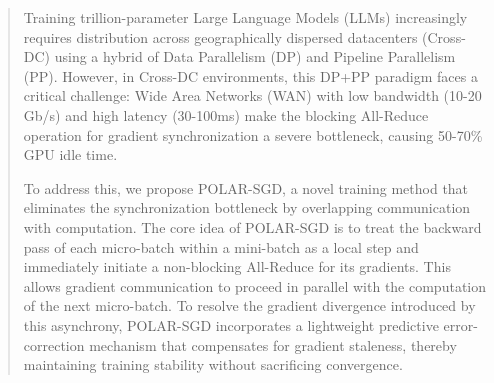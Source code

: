 \documentclass{article}
\theoremstyle{plain}
\theoremstyle{definition}
\theoremstyle{remark}
\begin{document}
\printAffiliationsAndNotice{}  %

\begin{abstract}
Training trillion-parameter Large Language Models (LLMs) increasingly requires distribution across geographically dispersed datacenters (Cross-DC) using a hybrid of Data Parallelism (DP) and Pipeline Parallelism (PP). However, in Cross-DC environments, this DP+PP paradigm faces a critical challenge: Wide Area Networks (WAN) with low bandwidth (10-20 Gb/s) and high latency (30-100ms) make the blocking All-Reduce operation for gradient synchronization a severe bottleneck, causing 50-70\% GPU idle time.

To address this, we propose POLAR-SGD, a novel training method that eliminates the synchronization bottleneck by overlapping communication with computation. The core idea of POLAR-SGD is to treat the backward pass of each micro-batch within a mini-batch as a local step and immediately initiate a non-blocking All-Reduce for its gradients. This allows gradient communication to proceed in parallel with the computation of the next micro-batch. To resolve the gradient divergence introduced by this asynchrony, POLAR-SGD incorporates a lightweight predictive error-correction mechanism that compensates for gradient staleness, thereby maintaining training stability without sacrificing convergence.


\end{abstract}
\end{document}
